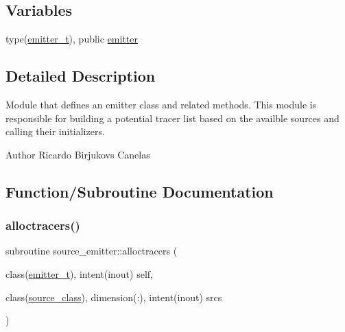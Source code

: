 \subsection*{Variables}
\begin{DoxyCompactItemize}
\item 
type(\mbox{\hyperlink{structsource__emitter_1_1emitter__t}{emitter\+\_\+t}}), public \mbox{\hyperlink{namespacesource__emitter_a357876a84a74e23c44e92ab8ef7dc35e}{emitter}}
\end{DoxyCompactItemize}


\subsection{Detailed Description}
Module that defines an emitter class and related methods. This module is responsible for building a potential tracer list based on the availble sources and calling their initializers. 

\begin{DoxyAuthor}{Author}
Ricardo Birjukovs Canelas 
\end{DoxyAuthor}


\subsection{Function/\+Subroutine Documentation}
\mbox{\label{namespacesource__emitter_a54e88b7aa868ff9de8cf018208a20585}} 
\subsubsection{\texorpdfstring{alloctracers()}{alloctracers()}}
{\footnotesize\ttfamily subroutine source\+\_\+emitter\+::alloctracers (\begin{DoxyParamCaption}\item[{class(\mbox{\hyperlink{structsource__emitter_1_1emitter__t}{emitter\+\_\+t}}), intent(inout)}]{self,  }\item[{class(\mbox{\hyperlink{structsource__identity_1_1source__class}{source\+\_\+class}}), dimension(\+:), intent(inout)}]{srcs }\end{DoxyParamCaption})\hspace{0.3cm}{\ttfamily [private]}}



